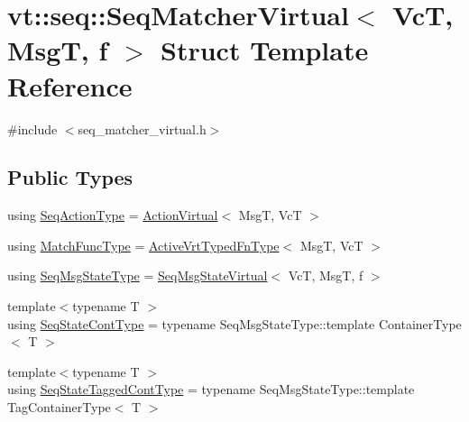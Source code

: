 \hypertarget{structvt_1_1seq_1_1_seq_matcher_virtual}{}\section{vt\+:\+:seq\+:\+:Seq\+Matcher\+Virtual$<$ VcT, MsgT, f $>$ Struct Template Reference}
\label{structvt_1_1seq_1_1_seq_matcher_virtual}


{\ttfamily \#include $<$seq\+\_\+matcher\+\_\+virtual.\+h$>$}

\subsection*{Public Types}
\begin{DoxyCompactItemize}
\item 
using \hyperlink{structvt_1_1seq_1_1_seq_matcher_virtual_aa53d05ef480fb78161b56db33018b3b0}{Seq\+Action\+Type} = \hyperlink{structvt_1_1seq_1_1_action_virtual}{Action\+Virtual}$<$ MsgT, VcT $>$
\item 
using \hyperlink{structvt_1_1seq_1_1_seq_matcher_virtual_a0aa078b1c0bd92a24d66073670b13b42}{Match\+Func\+Type} = \hyperlink{namespacevt_1_1vrt_a14077459ea3367e5834151d314ff4bc8}{Active\+Vrt\+Typed\+Fn\+Type}$<$ MsgT, VcT $>$
\item 
using \hyperlink{structvt_1_1seq_1_1_seq_matcher_virtual_a86488edc14c17416507b49dedef4c54f}{Seq\+Msg\+State\+Type} = \hyperlink{structvt_1_1seq_1_1_seq_msg_state_virtual}{Seq\+Msg\+State\+Virtual}$<$ VcT, MsgT, f $>$
\item 
{\footnotesize template$<$typename T $>$ }\\using \hyperlink{structvt_1_1seq_1_1_seq_matcher_virtual_a1ce5abe53e93d69d1b487e97fd30fdbd}{Seq\+State\+Cont\+Type} = typename Seq\+Msg\+State\+Type\+::template Container\+Type$<$ T $>$
\item 
{\footnotesize template$<$typename T $>$ }\\using \hyperlink{structvt_1_1seq_1_1_seq_matcher_virtual_ab6b75c420d0d3e46e729188d07c11ff2}{Seq\+State\+Tagged\+Cont\+Type} = typename Seq\+Msg\+State\+Type\+::template Tag\+Container\+Type$<$ T $>$
\end{DoxyCompactItemize}

